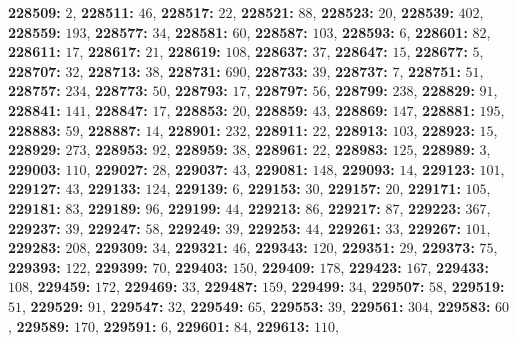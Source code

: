 \textsf{\bfseries 228509:} $2$, \textsf{\bfseries 228511:} $46$, \textsf{\bfseries 228517:} $22$, \textsf{\bfseries 228521:} $88$, \textsf{\bfseries 228523:} $20$, \textsf{\bfseries 228539:} $402$, \textsf{\bfseries 228559:} $193$, \textsf{\bfseries 228577:} $34$, \textsf{\bfseries 228581:} $60$, \textsf{\bfseries 228587:} $103$, \textsf{\bfseries 228593:} $6$, \textsf{\bfseries 228601:} $82$, \textsf{\bfseries 228611:} $17$, \textsf{\bfseries 228617:} $21$, \textsf{\bfseries 228619:} $108$, \textsf{\bfseries 228637:} $37$, \textsf{\bfseries 228647:} $15$, \textsf{\bfseries 228677:} $5$, \textsf{\bfseries 228707:} $32$, \textsf{\bfseries 228713:} $38$, \textsf{\bfseries 228731:} $690$, \textsf{\bfseries 228733:} $39$, \textsf{\bfseries 228737:} $7$, \textsf{\bfseries 228751:} $51$, \textsf{\bfseries 228757:} $234$, \textsf{\bfseries 228773:} $50$, \textsf{\bfseries 228793:} $17$, \textsf{\bfseries 228797:} $56$, \textsf{\bfseries 228799:} $238$, \textsf{\bfseries 228829:} $91$, \textsf{\bfseries 228841:} $141$, \textsf{\bfseries 228847:} $17$, \textsf{\bfseries 228853:} $20$, \textsf{\bfseries 228859:} $43$, \textsf{\bfseries 228869:} $147$, \textsf{\bfseries 228881:} $195$, \textsf{\bfseries 228883:} $59$, \textsf{\bfseries 228887:} $14$, \textsf{\bfseries 228901:} $232$, \textsf{\bfseries 228911:} $22$, \textsf{\bfseries 228913:} $103$, \textsf{\bfseries 228923:} $15$, \textsf{\bfseries 228929:} $273$, \textsf{\bfseries 228953:} $92$, \textsf{\bfseries 228959:} $38$, \textsf{\bfseries 228961:} $22$, \textsf{\bfseries 228983:} $125$, \textsf{\bfseries 228989:} $3$, \textsf{\bfseries 229003:} $110$, \textsf{\bfseries 229027:} $28$, \textsf{\bfseries 229037:} $43$, \textsf{\bfseries 229081:} $148$, \textsf{\bfseries 229093:} $14$, \textsf{\bfseries 229123:} $101$, \textsf{\bfseries 229127:} $43$, \textsf{\bfseries 229133:} $124$, \textsf{\bfseries 229139:} $6$, \textsf{\bfseries 229153:} $30$, \textsf{\bfseries 229157:} $20$, \textsf{\bfseries 229171:} $105$, \textsf{\bfseries 229181:} $83$, \textsf{\bfseries 229189:} $96$, \textsf{\bfseries 229199:} $44$, \textsf{\bfseries 229213:} $86$, \textsf{\bfseries 229217:} $87$, \textsf{\bfseries 229223:} $367$, \textsf{\bfseries 229237:} $39$, \textsf{\bfseries 229247:} $58$, \textsf{\bfseries 229249:} $39$, \textsf{\bfseries 229253:} $44$, \textsf{\bfseries 229261:} $33$, \textsf{\bfseries 229267:} $101$, \textsf{\bfseries 229283:} $208$, \textsf{\bfseries 229309:} $34$, \textsf{\bfseries 229321:} $46$, \textsf{\bfseries 229343:} $120$, \textsf{\bfseries 229351:} $29$, \textsf{\bfseries 229373:} $75$, \textsf{\bfseries 229393:} $122$, \textsf{\bfseries 229399:} $70$, \textsf{\bfseries 229403:} $150$, \textsf{\bfseries 229409:} $178$, \textsf{\bfseries 229423:} $167$, \textsf{\bfseries 229433:} $108$, \textsf{\bfseries 229459:} $172$, \textsf{\bfseries 229469:} $33$, \textsf{\bfseries 229487:} $159$, \textsf{\bfseries 229499:} $34$, \textsf{\bfseries 229507:} $58$, \textsf{\bfseries 229519:} $51$, \textsf{\bfseries 229529:} $91$, \textsf{\bfseries 229547:} $32$, \textsf{\bfseries 229549:} $65$, \textsf{\bfseries 229553:} $39$, \textsf{\bfseries 229561:} $304$, \textsf{\bfseries 229583:} $60$, \textsf{\bfseries 229589:} $170$, \textsf{\bfseries 229591:} $6$, \textsf{\bfseries 229601:} $84$, \textsf{\bfseries 229613:} $110$, 
